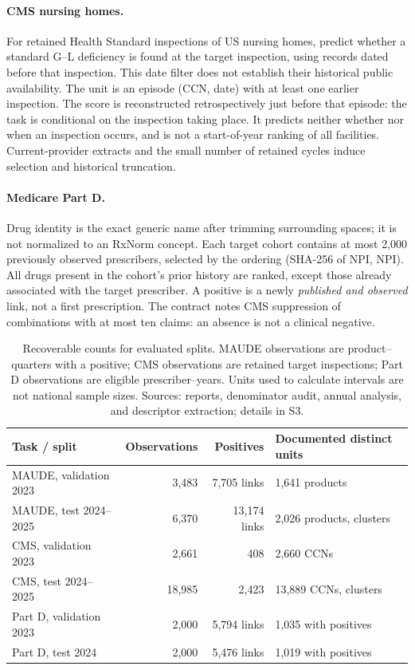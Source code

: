 \paragraph{CMS nursing homes.} For retained Health Standard inspections of US nursing homes, predict whether a standard G--L deficiency is found at the target inspection, using records dated before that inspection. This date filter does not establish their historical public availability. The unit is an episode (CCN, date) with at least one earlier inspection. The score is reconstructed retrospectively just before that episode: the task is conditional on the inspection taking place. It predicts neither whether nor when an inspection occurs, and is not a start-of-year ranking of all facilities. Current-provider extracts and the small number of retained cycles induce selection and historical truncation\cite{cmsnursing,hgbcontract,hgbcode}.

\paragraph{Medicare Part D.} Drug identity is the exact generic name after trimming surrounding spaces; it is not normalized to an RxNorm concept. Each target cohort contains at most 2,000 previously observed prescribers, selected by the ordering (SHA-256 of NPI, NPI). All drugs present in the cohort's prior history are ranked, except those already associated with the target prescriber. A positive is a newly \emph{published and observed} link, not a first prescription. The contract notes CMS suppression of combinations with at most ten claims: an absence is not a clinical negative\cite{cmspartd,hgbpartd}.

\begin{table}[!htbp]
\centering\footnotesize
\caption{Recoverable counts for evaluated splits. MAUDE observations are product--quarters with a positive; CMS observations are retained target inspections; Part D observations are eligible prescriber--years. Units used to calculate intervals are not national sample sizes. Sources: reports, denominator audit, annual analysis, and descriptor extraction\cite{hgbresults,hgbanalysis,hgbpartd}; details in S3.}
\label{tab:population}
\begin{tabularx}{\linewidth}{@{}lrrX@{}}
\toprule
Task / split & Observations & Positives & Documented distinct units\\
\midrule
MAUDE, validation 2023 & 3,483 & 7,705 links & 1,641 products\\
MAUDE, test 2024--2025 & 6,370 & 13,174 links & 2,026 products, clusters\\
CMS, validation 2023 & 2,661 & 408 & 2,660 CCNs\\
CMS, test 2024--2025 & 18,985 & 2,423 & 13,889 CCNs, clusters\\
Part D, validation 2023 & 2,000 & 5,794 links & 1,035 with positives\\
Part D, test 2024 & 2,000 & 5,476 links & 1,019 with positives\\
\bottomrule
\end{tabularx}
\end{table}

